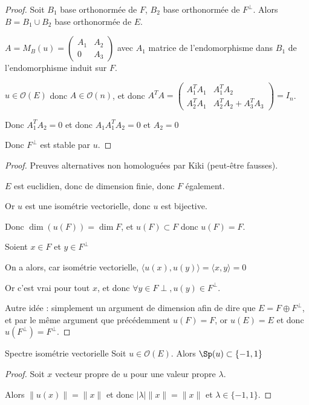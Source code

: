 \begin{proof}
    Soit $B_1$ base orthonormée de $F$, $B_2$ base orthonormée de $F^\perp$.
    Alors $B = B_1 \cup B_2$ base orthonormée de $E$.

    $A = M_B(u) = \begin{pmatrix}
        A_1 & A_2 \\
        0 & A_3
        \end{pmatrix}$ avec $A_1$ matrice de l'endomorphisme dans $B_1$
        de l'endomorphisme induit sur $F$. 

    $u \in \mathcal O(E)$ donc $A \in \mathcal O(n)$, et donc 
    $A^T A = \begin{pmatrix}
        A_1^T A_1 & A_1^T A_2 \\
        A_2^T A_1 & A_2^T A_2 + A_3^T A_3
    \end{pmatrix} = I_n$.

    Donc $A_1^T A_2 = 0$ et donc $A_1 A_1^T A_2 = 0$ et $A_2 = 0$ 

    Donc $F^\perp$ est stable par $u$.
\end{proof}

\begin{proof}
    Preuves alternatives non homologuées par Kiki (peut-être fausses). 

    $E$ est euclidien, donc de dimension finie, donc $F$ également. 

    Or $u$ est une isométrie vectorielle, donc $u$ est bijective. 

    Donc $\dim (u(F)) = \dim F$, et $u(F) \subset F$ donc $u(F) = F$. 

    Soient $x \in F$ et $y \in F^\perp$

    On a alors, car isométrie vectorielle, $\langle u(x), u(y) \rangle = \langle x, y \rangle = 0$

    Or c'est vrai pour tout $x$, et donc $\forall y \in F\perp, u(y) \in F^\perp$. 

    \lvspace Autre idée : simplement un argument de dimension afin de dire que $E = F \oplus F^\perp$, 
    et par le même argument que précédemment $u(F) = F$, or $u(E) = E$ et donc $u(F^\perp) = F^\perp$. 
\end{proof}

\begin{proposition}{Spectre isométrie vectorielle}{}
    Soit $u \in \mathcal O(E)$. Alors $\Sp (u) \subset \{ -1, 1 \}$
\end{proposition}

\begin{proof}
    Soit $x$ vecteur propre de $u$ pour une valeur propre $\lambda$. 

    Alors $\| u(x) \|  = \| x \|$ et donc $|\lambda| \| x \| = \| x \|$ et $\lambda \in \{ -1, 1 \}$.
\end{proof}

